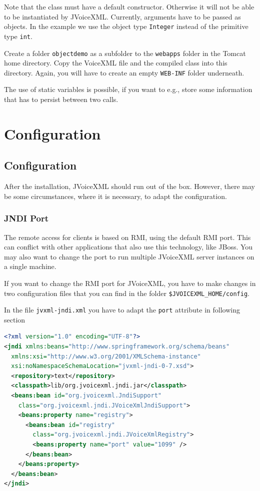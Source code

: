 \documentclass[11pt,a4paper]{book}
\begin{document}
Note that the class must have a default constructor. Otherwise it will not be
able to be instantiated by JVoiceXML. Currently, arguments have to be passed as
objects. In the example we use the object type \lstinline{Integer} instead of
the primitive type \lstinline{int}.

Create a folder \lstinline{objectdemo} as a subfolder to the \lstinline{webapps}
folder in the Tomcat home directory. Copy the VoiceXML file and the compiled
class into this directory. Again, you will have to create an empty
\lstinline{WEB-INF} folder underneath.

The use of static variables is possible, if you want
to e.g., store some information that has to persist between two calls.

\chapter{Configuration}

\section{Configuration}
\label{sec:configuration}

After the installation, JVoiceXML should run out of the box. However, there may 
be some circumstances, where it is necessary, to adapt the configuration.

\subsection{JNDI Port}
\label{sec:jndi-port}

The remote access for clients is based on RMI, using the default RMI port. This
can conflict with other applications that also use this technology, like JBoss.
You may also want to change the port to run multiple JVoiceXML server instances
on a single machine.

If you want to change the RMI port for JVoiceXML, you have to make changes in 
two configuration files that you can find in the folder 
\texttt{\$JVOICEXML\_HOME/config}.

In the file \texttt{jvxml-jndi.xml} you have to adapt the \texttt{port} 
attribute in following section

\begin{lstlisting}[language=XML]
<?xml version="1.0" encoding="UTF-8"?>
<jndi xmlns:beans="http://www.springframework.org/schema/beans"
  xmlns:xsi="http://www.w3.org/2001/XMLSchema-instance"
  xsi:noNamespaceSchemaLocation="jvxml-jndi-0-7.xsd">
  <repository>text</repository>
  <classpath>lib/org.jvoicexml.jndi.jar</classpath>
  <beans:bean id="org.jvoicexml.JndiSupport"
    class="org.jvoicexml.jndi.JVoiceXmlJndiSupport">
    <beans:property name="registry">
      <beans:bean id="registry"
        class="org.jvoicexml.jndi.JVoiceXmlRegistry">
        <beans:property name="port" value="1099" />
      </beans:bean>
    </beans:property>
  </beans:bean>
</jndi>
\end{lstlisting}
\end{document}
